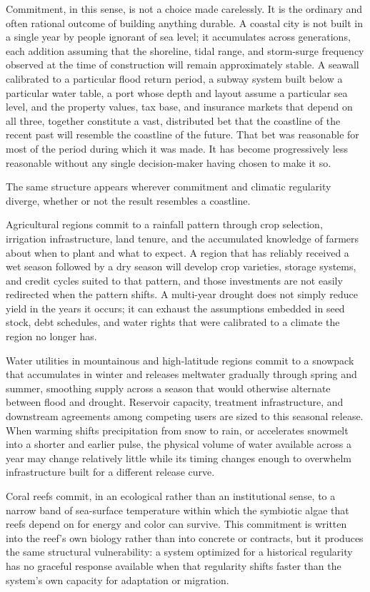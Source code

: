\documentclass[11pt,oneside]{book}
\begin{document}
Commitment, in this sense, is not a choice made carelessly. It is the ordinary and often rational outcome of building anything durable. A coastal city is not built in a single year by people ignorant of sea level; it accumulates across generations, each addition assuming that the shoreline, tidal range, and storm-surge frequency observed at the time of construction will remain approximately stable. A seawall calibrated to a particular flood return period, a subway system built below a particular water table, a port whose depth and layout assume a particular sea level, and the property values, tax base, and insurance markets that depend on all three, together constitute a vast, distributed bet that the coastline of the recent past will resemble the coastline of the future. That bet was reasonable for most of the period during which it was made. It has become progressively less reasonable without any single decision-maker having chosen to make it so.

The same structure appears wherever commitment and climatic regularity diverge, whether or not the result resembles a coastline.

Agricultural regions commit to a rainfall pattern through crop selection, irrigation infrastructure, land tenure, and the accumulated knowledge of farmers about when to plant and what to expect. A region that has reliably received a wet season followed by a dry season will develop crop varieties, storage systems, and credit cycles suited to that pattern, and those investments are not easily redirected when the pattern shifts. A multi-year drought does not simply reduce yield in the years it occurs; it can exhaust the assumptions embedded in seed stock, debt schedules, and water rights that were calibrated to a climate the region no longer has.

Water utilities in mountainous and high-latitude regions commit to a snowpack that accumulates in winter and releases meltwater gradually through spring and summer, smoothing supply across a season that would otherwise alternate between flood and drought. Reservoir capacity, treatment infrastructure, and downstream agreements among competing users are sized to this seasonal release. When warming shifts precipitation from snow to rain, or accelerates snowmelt into a shorter and earlier pulse, the physical volume of water available across a year may change relatively little while its timing changes enough to overwhelm infrastructure built for a different release curve.

Coral reefs commit, in an ecological rather than an institutional sense, to a narrow band of sea-surface temperature within which the symbiotic algae that reefs depend on for energy and color can survive. This commitment is written into the reef's own biology rather than into concrete or contracts, but it produces the same structural vulnerability: a system optimized for a historical regularity has no graceful response available when that regularity shifts faster than the system's own capacity for adaptation or migration.
\end{document}
